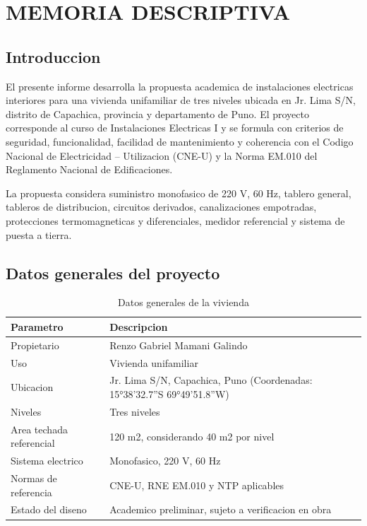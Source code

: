 \chapter{MEMORIA DESCRIPTIVA}

\section{Introduccion}

El presente informe desarrolla la propuesta academica de instalaciones electricas interiores para una vivienda unifamiliar de tres niveles ubicada en Jr. Lima S/N, distrito de Capachica, provincia y departamento de Puno. El proyecto corresponde al curso de Instalaciones Electricas I y se formula con criterios de seguridad, funcionalidad, facilidad de mantenimiento y coherencia con el Codigo Nacional de Electricidad -- Utilizacion (CNE-U) y la Norma EM.010 del Reglamento Nacional de Edificaciones.

La propuesta considera suministro monofasico de 220 V, 60 Hz, tablero general, tableros de distribucion, circuitos derivados, canalizaciones empotradas, protecciones termomagneticas y diferenciales, medidor referencial y sistema de puesta a tierra.

\section{Datos generales del proyecto}

\begin{table}[H]
\centering
\small
\caption{Datos generales de la vivienda}
\label{tab:datos-generales-vivienda}
\begin{tabularx}{\textwidth}{L{5.2cm}Y}
\toprule
\textbf{Parametro} & \textbf{Descripcion} \\
\midrule
Propietario & Renzo Gabriel Mamani Galindo \\
Uso & Vivienda unifamiliar \\
Ubicacion & Jr. Lima S/N, Capachica, Puno (Coordenadas: 15°38'32.7''S 69°49'51.8''W) \\
Niveles & Tres niveles \\
Area techada referencial & 120 m2, considerando 40 m2 por nivel \\
Sistema electrico & Monofasico, 220 V, 60 Hz \\
Normas de referencia & CNE-U, RNE EM.010 y NTP aplicables \\
Estado del diseno & Academico preliminar, sujeto a verificacion en obra \\
\bottomrule
\end{tabularx}
\end{table}

